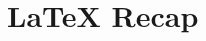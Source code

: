 \documentclass{beamer}
\subtitle{Part 2: Graphics, References \& More}
\begin{document}
\begin{frame}
\titlepage
\end{frame}


\section{\LaTeX{} Recap}
\end{document}

